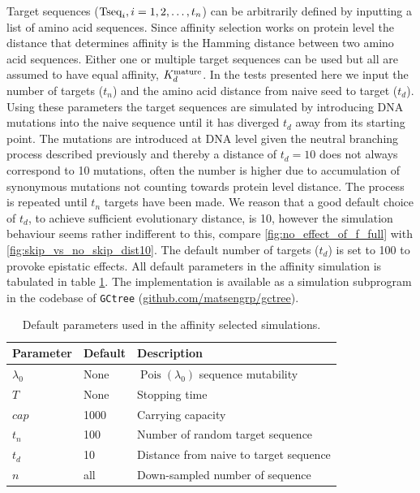 Target sequences ($\text{Tseq}_i, i=1,2, \hdots, t_n$) can be arbitrarily defined by inputting a list of amino acid sequences.
Since affinity selection works on protein level the distance that determines affinity is the Hamming distance between two amino acid sequences.
Either one or multiple target sequences can be used but all are assumed to have equal affinity, $K^{\text{mature}}_d$.
In the tests presented here we input the number of targets ($t_n$) and the amino acid distance from naive seed to target ($t_d$).
Using these parameters the target sequences are simulated by introducing DNA mutations into the naive sequence until it has diverged $t_d$ away from its starting point.
The mutations are introduced at DNA level given the neutral branching process described previously and thereby a distance of $t_d=10$ does not always correspond to 10 mutations, often the number is higher due to accumulation of synonymous mutations not counting towards protein level distance.
The process is repeated until $t_n$ targets have been made.
We reason that a good default choice of $t_d$, to achieve sufficient evolutionary distance, is 10, however the simulation behaviour seems rather indifferent to this, compare \ref{fig:no_effect_of_f_full} with \ref{fig:skip_vs_no_skip_dist10}.
The default number of targets ($t_d$) is set to 100 to provoke epistatic effects.
All default parameters in the affinity simulation is tabulated in table \ref{aff_constants}.
The implementation is available as a simulation subprogram in the codebase of \texttt{GCtree} (\url{github.com/matsengrp/gctree}).

\begin{table}[ht]
\centering
\begin{tabular}{lll}
Parameter    & Default & Description \\ \hline
$\lambda_0$ & None & $\operatorname{Pois}(\lambda_0)$ sequence mutability \\
$T$ & None & Stopping time \\
$cap$ & 1000 & Carrying capacity \\
$t_n$ & 100 & Number of random target sequence \\
$t_d$ & 10 & Distance from naive to target sequence \\
$n$ & all & Down-sampled number of sequence
\end{tabular}
\caption{
\label{aff_constants}
    Default parameters used in the affinity selected simulations.}
\end{table}










